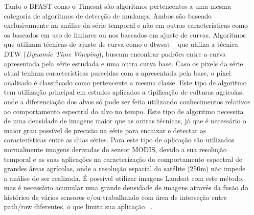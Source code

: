 \documentclass{article}
\begin{document}
Tanto o BFAST como o Timesat são algoritmos pertencentes a uma mesma categoria de algoritmos de detecção de mudança. Ambos são baseado exclusivamente na análise da série temporal e não em outras características como os baseados em uso de limiares ou nos baseados em ajuste de curvas. Algoritmos que utilizam técnicas de ajuste de curva como o dtwsat ~\cite{Maus2019} que utiliza a técnica DTW (\textit{Dynamic Time Warping}), buscam encontrar padrões entre a curva apresentada pela série estudada e uma outra curva base. Caso os pixels da série atual tenham características parecidas com a apresentada pela base, o pixel analisado é classificado como pertencente a mesma classe. Este tipo de algoritmo tem utilização principal em estudos aplicados a tipificação de culturas agrícolas, onde a diferenciação dos alvos só pode ser feita utilizando conhecimentos relativos ao comportamento espectral do alvo no tempo. Este tipo de algoritmo necessita de uma densidade de imagens maior que as outras técnicas, já que é necessário o maior grau possível de precisão na série para encaixar e detectar as características entre as duas séries. Para este tipo de aplicação são utilizados normalmente imagens derivadas do sensor MODIS, devido a sua resolução temporal e as suas aplicações na caracterização do comportamento espectral de grandes áreas agrícolas, onde a resolução espacial do satélite (250m) não impede a análise de ser realizada. É possível utilizar imagens Landsat com este método, mas é necessário acumular uma grande densidade de imagens através da fusão do histórico de vários sensores e/ou trabalhando com área de interseção entre path/row diferentes, o que limita sua aplicação ~\cite{Bendini2016}.
\par


\begin{comment}
    Brazil made an ambitious pledge of 12 Mha as a contribution to the Bonn Challenge global target of bringing 150 and 350 Mha of  degraded/deforested lands under restoration by 2020 and 2030, respectively (www.bonnchallenge.org).
    
    It is also part of Brazil’s pledge to the Paris Climate Agreement 
    (http://www.mma.gov.br/images/arquivo/80108/BRASIL%
    INAL.pdf) and its National Policy for Native Vegetation Recovery 
    (http://www.mma.gov.br/images/arquivos/florestas/planaveg_plano_nacional_recuperacao_vegetacao_nativa.pdf).
\end{comment}




\end{document}
